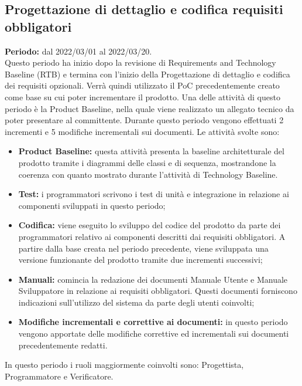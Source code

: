 
 \subsection{Progettazione di dettaglio e codifica requisiti obbligatori} \label{subsection:pianificazione_requisiti_obbligatori}
\textbf{Periodo:} dal 2022/03/01 al 2022/03/20.
\bigskip
\\Questo periodo ha inizio dopo la revisione di Requirements and Technology Baseline (RTB) e termina con l'inizio della Progettazione di dettaglio e codifica dei requisiti opzionali.
Verrà quindi utilizzato il PoC precedentemente creato come base su cui poter incrementare il prodotto.
Una delle attività di questo periodo è la Product Baseline, nella quale viene realizzato un allegato tecnico da poter presentare al committente.
Durante questo periodo vengono effettuati 2 incrementi e 5 modifiche incrementali sui documenti.
Le attività svolte sono:
\begin{itemize}
  \item \textbf{Product Baseline:} questa attività presenta la baseline architetturale del prodotto tramite i diagrammi delle classi e di sequenza, mostrandone la coerenza con quanto mostrato durante l'attività di Technology Baseline.
  \item \textbf{Test:} i programmatori scrivono i test di unità e integrazione in relazione ai componenti sviluppati in questo periodo;
  \item \textbf{Codifica:} viene eseguito lo sviluppo del codice del prodotto da parte dei programmatori relativo ai componenti descritti dai requisiti obbligatori.
  A partire dalla base creata nel periodo precedente, viene sviluppata una versione funzionante del prodotto tramite due incrementi successivi;
  \item \textbf{Manuali:} comincia la redazione dei documenti Manuale Utente e Manuale Sviluppatore in relazione ai requisiti obbligatori.
  Questi documenti forniscono indicazioni sull'utilizzo del sistema da parte degli utenti coinvolti;
  \item \textbf{Modifiche incrementali e correttive ai documenti:} in questo periodo vengono apportate delle modifiche correttive ed incrementali sui documenti precedentemente redatti.
\end{itemize}
In questo periodo i ruoli maggiormente coinvolti sono: Progettista, Programmatore e Verificatore.
\bigskip
